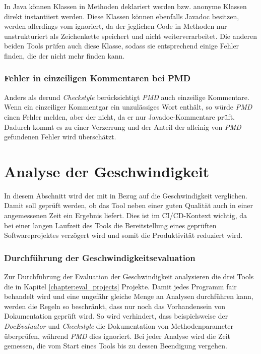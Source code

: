 In Java können Klassen in Methoden deklariert werden bzw. anonyme Klassen direkt instantiiert werden. Diese Klassen können ebenfalls Javadoc besitzen, werden allerdings vom \doceval ignoriert, da der \doceval jeglichen Code in Methoden nur unstrukturiert als Zeichenkette speichert und nicht weiterverarbeitet. Die anderen beiden Tools prüfen auch diese Klasse, sodass sie entsprechend einige Fehler finden, die der \doceval nicht mehr finden kann. 


\subsubsection{Fehler in einzeiligen Kommentaren bei PMD}
Anders als der\doceval und \textit{Checkstyle} berücksichtigt \textit{PMD} auch einzeilige Kommentare. Wenn ein einzeiliger Kommentgar ein unzulässiges Wort enthält, so würde \textit{PMD} einen Fehler melden, aber der \doceval nicht, da er nur Javadoc-Kommentare prüft. Dadurch kommt es zu einer Verzerrung und der Anteil der alleinig von \textit{PMD} gefundenen Fehler wird überschätzt.  


\clearpage

 \section{Analyse der Geschwindigkeit} \label{chapter:speed}
 In diesem Abschnitt wird der \doceval mit \checkpmd in Bezug auf die Geschwindigkeit verglichen. Damit soll geprüft werden, ob das Tool neben einer guten Qualität auch in einer angemessenen Zeit ein Ergebnis liefert. Dies ist im \ac{CI/CD}-Kontext wichtig, da bei einer langen Laufzeit des Tools  die Bereitstellung eines geprüften Softwareprojektes verzögert wird und somit die Produktivität reduziert wird. 
 
 \subsubsection{Durchführung der Geschwindigkeitsevaluation}
 Zur Durchführung der Evaluation der Geschwindigkeit analysieren die drei Tools die in Kapitel \ref{chapter:eval_projects} Projekte. Damit jedes Programm fair behandelt wird und eine ungefähr gleiche Menge an Analysen durchführen kann, werden die Regeln so beschränkt, dass nur noch das Vorhandensein von Dokumentation geprüft wird. So wird verhindert, dass beispielsweise der \textit{DocEvaluator} und \textit{Checkstyle} die Dokumentation von Methodenparameter überprüfen, während \textit{PMD} dies ignoriert. Bei jeder Analyse wird die Zeit gemessen, die vom Start eines Tools bis zu dessen Beendigung vergehen. 
 
